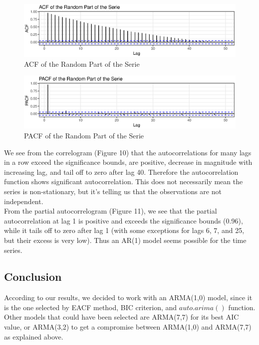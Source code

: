 \FloatBarrier
\begin{figure}[!htbp]
  \centering
  \includegraphics[width=\textwidth]{img/Fig7d.eps}
  \caption{ACF of the Random Part of the Serie}
\end{figure}
\FloatBarrier
\begin{figure}[!htbp]
  \centering
  \includegraphics[width=\textwidth]{img/Fig7e.eps}
  \caption{PACF of the Random Part of the Serie}
\end{figure}
\FloatBarrier
We see from the correlogram (Figure 10) that the autocorrelations for many lags in a row exceed the significance bounds, are positive, decrease in magnitude with increasing lag, and tail off to zero after lag 40. Therefore the autocorrelation function shows significant autocorrelation. This does not necessarily mean the series is non-stationary, but it's telling us that the observations are not independent. \\
From the partial autocorrelogram (Figure 11), we see that the partial autocorrelation at lag 1 is positive and exceeds the significance bounds (0.96), while it tails off to zero after lag 1 (with some exceptions for lags 6, 7, and 25, but their excess is very low). Thus an AR(1) model seems possible for the time series.


\subsection{Conclusion}
According to our results, we decided to work with an ARMA(1,0) model, since it is the one selected by EACF method, BIC criterion, and $auto.arima()$ function. Other models that could have been selected are ARMA(7,7) for its best AIC value, or ARMA(3,2) to get a compromise between ARMA(1,0) and ARMA(7,7) as explained above.\\


